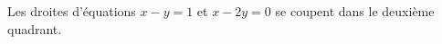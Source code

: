 Les droites d'équations $x-y=1$ et $x-2y=0$ se coupent dans le deuxième quadrant.

\begin{reponses}
\end{reponses}

